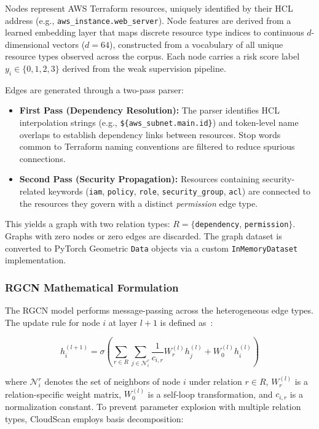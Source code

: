 \documentclass[conference]{IEEEtran}
\begin{document}
Nodes represent AWS Terraform resources, uniquely identified by their HCL address (e.g., \texttt{aws\_instance.web\_server}). Node features are derived from a learned embedding layer that maps discrete resource type indices to continuous $d$-dimensional vectors ($d = 64$), constructed from a vocabulary of all unique resource types observed across the corpus. Each node carries a risk score label $y_i \in \{0, 1, 2, 3\}$ derived from the weak supervision pipeline.

Edges are generated through a two-pass parser:

\begin{itemize}
    \item \textbf{First Pass (Dependency Resolution):} The parser identifies HCL interpolation strings (e.g., \texttt{\$\{aws\_subnet.main.id\}}) and token-level name overlaps to establish dependency links between resources. Stop words common to Terraform naming conventions are filtered to reduce spurious connections.
    \item \textbf{Second Pass (Security Propagation):} Resources containing security-related keywords (\texttt{iam}, \texttt{policy}, \texttt{role}, \texttt{security\_group}, \texttt{acl}) are connected to the resources they govern with a distinct \textit{permission} edge type.
\end{itemize}

This yields a graph with two relation types: $R = \{$\texttt{dependency}, \texttt{permission}$\}$. Graphs with zero nodes or zero edges are discarded. The graph dataset is converted to PyTorch Geometric \texttt{Data} objects via a custom \texttt{InMemoryDataset} implementation.

\subsubsection{RGCN Mathematical Formulation}

The RGCN model performs message-passing across the heterogeneous edge types. The update rule for node $i$ at layer $l+1$ is defined as~\cite{schlichtkrull2018}:

\begin{equation}
h_i^{(l+1)} = \sigma \left( \sum_{r \in R} \sum_{j \in \mathcal{N}_i^r} \frac{1}{c_{i,r}} W_r^{(l)} h_j^{(l)} + W_0^{(l)} h_i^{(l)} \right)
\label{eq:rgcn}
\end{equation}

where $\mathcal{N}_i^r$ denotes the set of neighbors of node $i$ under relation $r \in R$, $W_r^{(l)}$ is a relation-specific weight matrix, $W_0^{(l)}$ is a self-loop transformation, and $c_{i,r}$ is a normalization constant. To prevent parameter explosion with multiple relation types, CloudScan employs basis decomposition:
\end{document}
